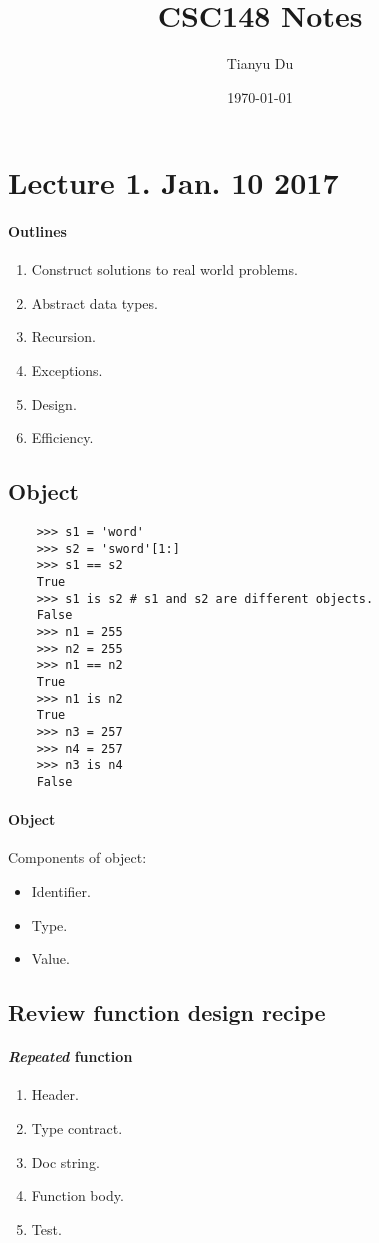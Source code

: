 \documentclass{article}
\title{CSC148 Notes}
\author{Tianyu Du}
\date{\today}
\begin{document}
	\maketitle
	\doclicenseThis
	\tableofcontents
	\section{Lecture 1. Jan. 10 2017}
	\paragraph{Outlines}
	\begin{enumerate}
		\item Construct solutions to real world problems.
		\item Abstract data types.
		\item Recursion.
		\item Exceptions.
		\item Design.
		\item Efficiency.
	\end{enumerate}
	\subsection{Object}
	\begin{verbatim}
	>>> s1 = 'word'
	>>> s2 = 'sword'[1:]
	>>> s1 == s2
	True
	>>> s1 is s2 # s1 and s2 are different objects.
	False
	>>> n1 = 255
	>>> n2 = 255
	>>> n1 == n2
	True
	>>> n1 is n2
	True
	>>> n3 = 257
	>>> n4 = 257
	>>> n3 is n4
	False
	\end{verbatim}
	\paragraph{Object} Components of object:
	\begin{itemize}
		\item Identifier.
		\item Type.
		\item Value. 
	\end{itemize}
	
	\subsection{Review function design recipe}
	\paragraph{\emph{Repeated} function}

	\begin{enumerate}
		\item Header.
		\item Type contract.
		\item Doc string.
		\item Function body.
		\item Test.
	\end{enumerate}
\end{document}
